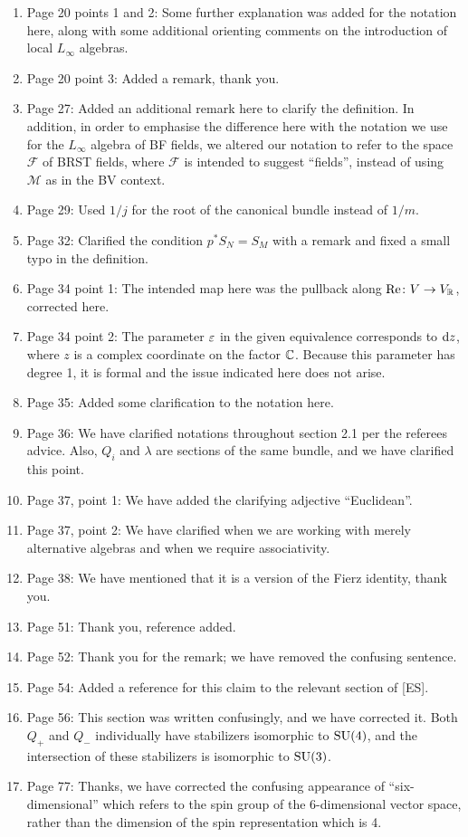 \documentclass[10pt, oneside]{article}
\begin{document}
\begin{enumerate}
 \item Page 20 points 1 and 2: Some further explanation was added for the notation here, along with some additional orienting comments on the introduction of local $L_\infty$ algebras.
 \item Page 20 point 3: Added a remark, thank you.
 \item Page 27: Added an additional remark here to clarify the definition.  In addition, in order to emphasise the difference here with the notation we use for the $L_\infty$ algebra of BF fields, we altered our notation to refer to the space $\mathcal F$ of BRST fields, where $\mathcal F$ is intended to suggest ``fields'', instead of using $\mathcal M$ as in the BV context. \item Page 29: Used $1/j$ for the root of the canonical bundle instead of $1/m$.
 \item Page 32: Clarified the condition $p^*S_N = S_M$ with a remark and fixed a small typo in the definition.
 \item Page 34 point 1: The intended map here was the pullback along $\mathrm{Re} \colon V \to V_\mathbb R$, corrected here.
 \item Page 34 point 2: The parameter $\varepsilon$ in the given equivalence corresponds to ${\rm d} z$, where $z$ is a complex coordinate on the factor $\mathbb C$.  Because this parameter has degree 1, it is formal and the issue indicated here does not arise.
 \item Page 35: Added some clarification to the notation here.
 \item Page 36: We have clarified notations throughout section 2.1 per the referees advice. Also, $Q_i$ and $\lambda$ are sections of the same bundle, and we have clarified this point.
 \item Page 37, point 1: We have added the clarifying adjective ``Euclidean''.
 \item Page 37, point 2: We have clarified when we are working with merely alternative algebras and when we require associativity.
 \item Page 38: We have mentioned that it is a version of the Fierz identity, thank you.
 \item Page 51: Thank you, reference added.
 \item Page 52: Thank you for the remark; we have removed the confusing sentence.
 \item Page 54: Added a reference for this claim to the relevant section of [ES].
 \item Page 56: This section was written confusingly, and we have corrected it.  Both $Q_+$ and $Q_-$ individually have stabilizers isomorphic to $\mathrm{SU}(4)$, and the intersection of these stabilizers is isomorphic to $\mathrm{SU}(3)$.
 \item Page 77: Thanks, we have corrected the confusing appearance of ``six-dimensional'' which refers to the spin group of the 6-dimensional vector space, rather than the dimension of the spin representation which is 4.
\end{enumerate}

 
\end{document}
